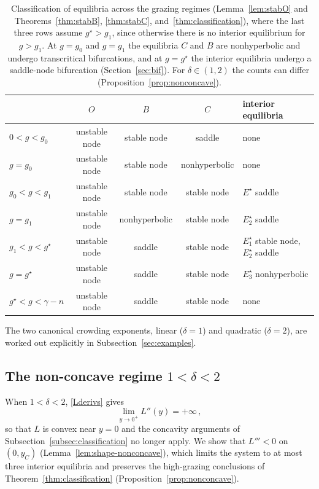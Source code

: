 \documentclass[reqno,11pt]{amsart}
\numberwithin{equation}{section}
\begin{document}
\begin{table}[H]
\centering
\small
\setlength{\tabcolsep}{4pt}
\renewcommand{\arraystretch}{1.25}
\begin{tabular}{lcccl}
\toprule
& $O$ & $B$ & $C$ & interior equilibria\\
\midrule
$0<g<g_0$        & unstable node & stable node   & saddle       & none\\
$g=g_0$          & unstable node & stable node   & nonhyperbolic & none\\
$g_0<g<g_1$      & unstable node & stable node   & stable node  & $E^\star$ saddle\\
$g=g_1$          & unstable node & nonhyperbolic & stable node  & $E_2^\star$ saddle\\
$g_1<g<g^\star$   & unstable node & saddle        & stable node  & $E_1^\star$ stable node, $E_2^\star$ saddle\\
$g=g^\star$       & unstable node & saddle        & stable node  & $E_3^\star$ nonhyperbolic\\
$g^\star<g<\gamma-n$ & unstable node & saddle     & stable node  & none\\
\bottomrule
\end{tabular}
\caption{Classification of equilibria across the grazing regimes (Lemma~\ref{lem:stabO} and Theorems~\ref{thm:stabB}, \ref{thm:stabC}, and~\ref{thm:classification}), where the last three rows assume $g^\star>g_1$, since otherwise there is no interior equilibrium for $g>g_1$. At $g=g_0$ and $g=g_1$ the equilibria $C$ and $B$ are nonhyperbolic and undergo transcritical bifurcations, and at $g=g^\star$ the interior equilibria undergo a saddle-node bifurcation (Section~\ref{sec:bif}). For $\delta \in (1,2)$ the counts can differ (Proposition~\ref{prop:nonconcave}).}
\label{tab:classification}
\end{table}

The two canonical crowding exponents, linear ($\delta=1$) and quadratic ($\delta=2$), are worked out explicitly in Subsection~\ref{sec:examples}.

\smallskip

\subsection{The non-concave regime \texorpdfstring{$1<\delta<2$}{1<delta<2}}\label{subsec:nonconcave}

When $1<\delta<2$, \eqref{Lderivs} gives
\[
\lim_{y\to0^+}L''(y)=+\infty\,,
\]
so that $L$ is convex near $y=0$ and the concavity arguments of Subsection~\ref{subsec:classification} no longer apply. We show that $L'''<0$ on $(0,y_C)$ (Lemma~\ref{lem:shape-nonconcave}), which limits the system to at most three interior equilibria and preserves the high-grazing conclusions of Theorem~\ref{thm:classification} (Proposition~\ref{prop:nonconcave}).
\end{document}
